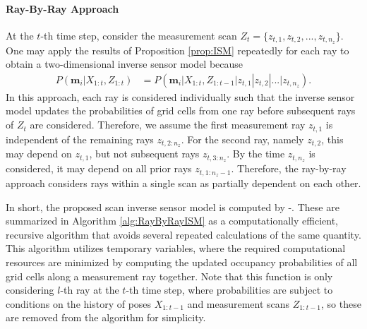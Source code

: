 \paragraph{Ray-By-Ray Approach}

At the $t$-th time step, consider the measurement scan $Z_t=\{z_{t,1},z_{t,2},...,z_{t,n_z}\}$. One may apply the results of Proposition \ref{prop:ISM} repeatedly for each ray to obtain a two-dimensional inverse sensor model because
\begin{align}
\label{eqn:RayByRayScanISM}
P(\mathbf{m}_i|X_{1:t},Z_{1:t})&%
=P(\mathbf{m}_i|X_{1:t},Z_{1:t-1}|z_{t,1}|z_{t,2}|...|z_{t,n_z}).
\end{align}
In this approach, each ray is considered individually such that the inverse sensor model updates the probabilities of grid cells from one ray before subsequent rays of $Z_t$ are considered. Therefore, we assume the first measurement ray $z_{t,1}$ is independent of the remaining rays $z_{t,2:n_z}$. For the second ray, namely $z_{t,2}$, this may depend on $z_{t,1}$, but not subsequent rays $z_{t,3:n_z}$. By the time $z_{t,n_z}$ is considered, it may depend on all prior rays $z_{t,1:n_z-1}$. Therefore, the ray-by-ray approach considers rays within a single scan as partially dependent on each other.

In short, the proposed scan inverse sensor model is computed by -. These are summarized in Algorithm \ref{alg:RayByRayISM} as a computationally efficient, recursive algorithm that avoids several repeated calculations of the same quantity. This algorithm utilizes temporary variables, where the required computational resources are minimized by computing the updated occupancy probabilities of all grid cells along a measurement ray together. Note that this function is only considering $l$-th ray at the $t$-th time step, where probabilities are subject to conditions on the history of poses $X_{1:t-1}$ and measurement scans $Z_{1:t-1}$, so these are removed from the algorithm for simplicity.

